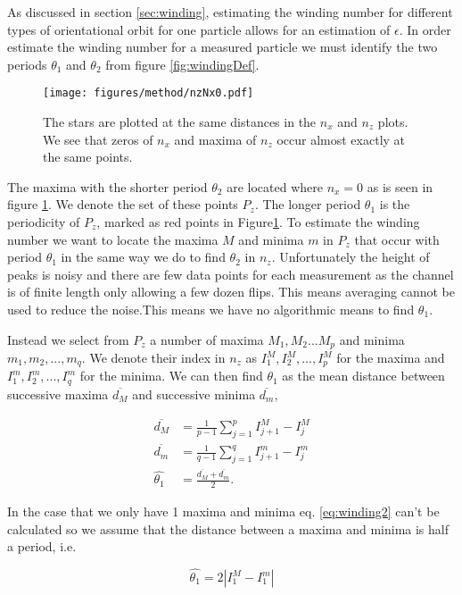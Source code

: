 	\label{sec:windingEstimation}
As discussed in section \ref{sec:winding}, estimating the winding number for different types of orientational orbit for one particle allows for an estimation of $\epsilon$. In order estimate the winding number for a measured 
particle we must identify the two periods $\theta_1$ and $\theta_2$ from figure \ref{fig:windingDef}. 


\begin{figure}
\centering
\texttt{[image: figures/method/nzNx0.pdf]}
\caption{The stars are plotted at the same distances in the $n_x$ and $n_z$ plots. We see that zeros of $n_x$ and maxima of $n_z$ occur almost exactly at the same points.}
\label{fig:nzNx0}
\end{figure}

The maxima with the shorter period $\theta_2$ are located where $n_x = 0$ as is seen in figure \ref{fig:nzNx0}. We denote the set of these points $P_z$. The longer period $\theta_1$ is the periodicity of $P_z$, marked as red points in Figure\ref{fig:nzNx0}. To estimate the winding number we want to locate the maxima $M$ and minima $m$ in $P_z$ that occur with period $\theta_1$ in the same way we do to find $\theta_2$ in $n_z$. Unfortunately the height of peaks is noisy and there are few data points for each measurement as the channel is of finite length only allowing a few dozen flips. This means averaging cannot be used to reduce the noise.This means we have no algorithmic means to find $\theta_1$. 

Instead we select from $P_z$ a number of maxima $M_1, M_2 ... M_p$ and minima $m_1, m_2, ..., m_q$. We denote their index in $n_z$ as $I^M_1, I^M_2, 
..., I^M_p$ for the maxima and $I^m_1, I^m_2, ..., I^m_q$ for the minima. We can then find $\theta_1$ as the mean distance between successive maxima $\overline{d_M}$ and successive minima $\overline{d_m}$, 

\begin{align}
\overline{d_M} &= \frac{1}{p-1} \sum\limits_{j=1}^{p} I^M_{j+1} - I^M_{j} \\
\overline{d_m} &= \frac{1}{q-1} \sum\limits_{j=1}^{q} I^m_{j+1}- I^m_{j}\\
\hat{\theta_1}   &= \frac{\overline{d_M} + \overline{d_m}}{2}.
\label{eq:winding2}
\end{align}

In the case that we only have 1 maxima and minima eq. \ref{eq:winding2} can't be calculated so we assume that the distance between a maxima and minima is half a period, i.e.

\begin{equation}
\hat{\theta_1} = 2\left| I^M_1 - I^m_1 \right|
\end{equation}